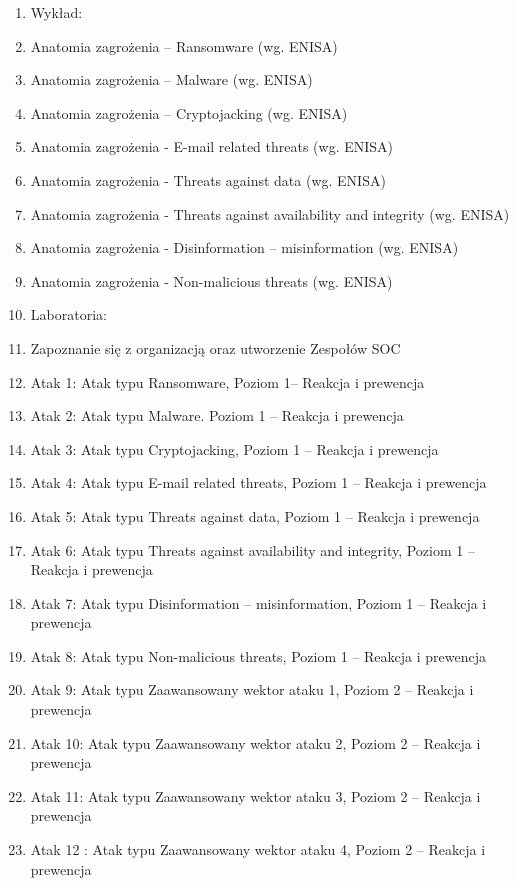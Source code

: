 \documentclass[12pt, a4paper]{article}
\begin{document}
\begin{enumerate}
  \item Wykład:
  \item Anatomia zagrożenia – Ransomware (wg. ENISA)
  \item Anatomia zagrożenia – Malware (wg. ENISA)
  \item Anatomia zagrożenia – Cryptojacking (wg. ENISA)
  \item Anatomia zagrożenia - E-mail related threats (wg. ENISA)
  \item Anatomia zagrożenia - Threats against data (wg. ENISA)
  \item Anatomia zagrożenia - Threats against availability and integrity (wg. ENISA)
  \item Anatomia zagrożenia - Disinformation – misinformation (wg. ENISA)
  \item Anatomia zagrożenia - Non-malicious threats (wg. ENISA)
  \item Laboratoria:
  \item Zapoznanie się z organizacją oraz utworzenie Zespołów SOC
  \item Atak 1: Atak typu Ransomware, Poziom 1– Reakcja i prewencja
  \item Atak 2: Atak typu Malware. Poziom 1 – Reakcja i prewencja
  \item Atak 3: Atak typu Cryptojacking, Poziom 1 – Reakcja i prewencja
  \item Atak 4: Atak typu E-mail related threats, Poziom 1 – Reakcja i prewencja
  \item Atak 5: Atak typu Threats against data, Poziom 1 – Reakcja i prewencja
  \item Atak 6: Atak typu Threats against availability and integrity, Poziom 1 – Reakcja i prewencja
  \item Atak 7: Atak typu Disinformation – misinformation, Poziom 1 – Reakcja i prewencja
  \item Atak 8: Atak typu Non-malicious threats, Poziom 1 – Reakcja i prewencja
  \item Atak 9: Atak typu Zaawansowany wektor ataku 1, Poziom 2  – Reakcja i prewencja
  \item Atak 10: Atak typu Zaawansowany wektor ataku 2, Poziom 2  – Reakcja i prewencja
  \item Atak 11: Atak typu Zaawansowany wektor ataku 3, Poziom 2  – Reakcja i prewencja
  \item Atak 12 : Atak typu Zaawansowany wektor ataku 4, Poziom 2  – Reakcja i prewencja
\end{enumerate}
\end{document}
